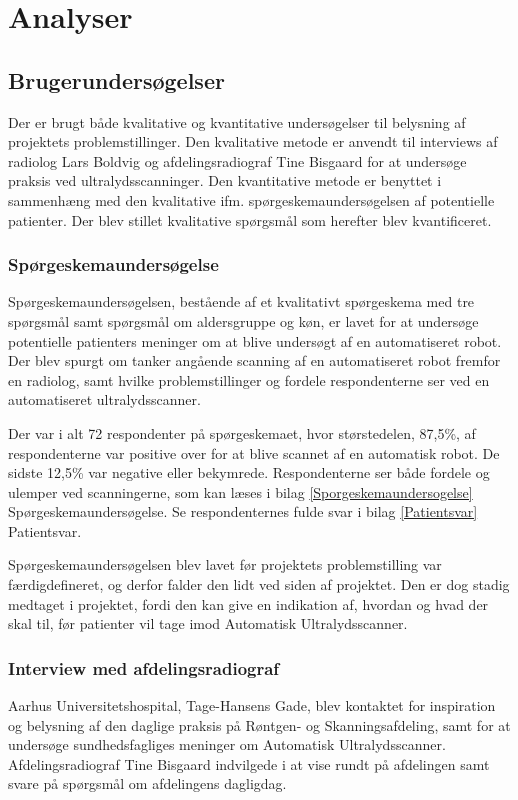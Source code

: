 \chapter{Analyser}\label{Analyser}

\section{Brugerundersøgelser}
Der er brugt både kvalitative og kvantitative undersøgelser til belysning af projektets problemstillinger. Den kvalitative metode er anvendt til interviews af radiolog Lars Boldvig og afdelingsradiograf Tine Bisgaard for at undersøge praksis ved ultralydsscanninger. Den kvantitative metode er benyttet i sammenhæng med den kvalitative ifm. spørgeskemaundersøgelsen af potentielle patienter. Der blev stillet kvalitative spørgsmål som herefter blev kvantificeret.

\subsection*{Spørgeskemaundersøgelse}
Spørgeskemaundersøgelsen, bestående af et kvalitativt spørgeskema med tre spørgsmål samt spørgsmål om aldersgruppe og køn, er lavet for at undersøge potentielle patienters meninger om at blive undersøgt af en automatiseret robot. Der blev spurgt om tanker angående scanning af en automatiseret robot fremfor en radiolog, samt hvilke problemstillinger og fordele respondenterne ser ved en automatiseret ultralydsscanner. 

Der var i alt 72 respondenter på spørgeskemaet, hvor størstedelen, 87,5\%, af respondenterne var positive over for at blive scannet af en automatisk robot. De sidste 12,5\% var negative eller bekymrede. Respondenterne ser både fordele og ulemper ved scanningerne, som kan læses i bilag \ref{Sporgeskemaundersogelse} Spørgeskemaundersøgelse. Se respondenternes fulde svar i bilag \ref{Patientsvar} Patientsvar. 

Spørgeskemaundersøgelsen blev lavet før projektets problemstilling var færdigdefineret, og derfor falder den lidt ved siden af projektet. Den er dog stadig medtaget i projektet, fordi den kan give en indikation af, hvordan og hvad der skal til, før patienter vil tage imod Automatisk Ultralydsscanner. 

\subsection*{Interview med afdelingsradiograf} 
Aarhus Universitetshospital, Tage-Hansens Gade, blev kontaktet for inspiration og belysning af den daglige praksis på Røntgen- og Skanningsafdeling, samt for at undersøge sundhedsfagliges meninger om Automatisk Ultralydsscanner. Afdelingsradiograf Tine Bisgaard indvilgede i at vise rundt på afdelingen samt svare på spørgsmål om afdelingens dagligdag. 

